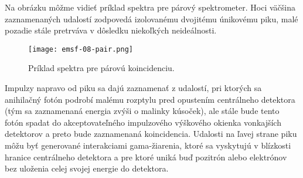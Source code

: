 \documentclass[../../main.tex]{subfiles}
\begin{document}
Na obrázku môžme vidieť príklad spektra pre párový spektrometer. Hoci väčšina zaznamenaných udalostí zodpovedá izolovanému dvojitému únikovému piku, malé pozadie stále pretrváva v dôsledku niekoľkých neideálnosti. 

\begin{figure}[!h]
\texttt{[image: emsf-08-pair.png]}
\centering
\caption{Príklad spektra pre párovú koincidenciu.}
\label{em8:fig:pair}
\end{figure}

Impulzy napravo od piku sa dajú zaznamenať z udalostí, pri ktorých sa anihilačný fotón podrobí malému rozptylu pred opustením centrálneho detektora (tým sa zaznamenaná energia zvýši o malinky kúsoček), ale stále bude tento fotón spadat do akceptovateľného impulzového výškového okienka vonkajších detektorov a preto bude zaznamenaná koincidencia. Udalosti na ľavej strane piku môžu byť generované interakciami gama-žiarenia, ktoré sa vyskytujú v blízkosti hranice centrálneho detektora a pre ktoré uniká buď pozitrón alebo elektrónov bez uloženia celej svojej energie do detektora.
\end{document}
